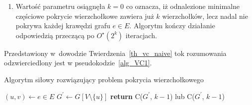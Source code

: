 {\begin{bproof}
\begin{enumerate}
      \item Wartość parametru osiągnęła $k=0$ co oznacza, iż odnalezione minimalne częściowe pokrycie wierzchołkowe zawiera już $k$ wierzchołków, lecz nadal nie pokrywa każdej krawędzi grafu $e \in E$.
      Algorytm kończy działanie odpowiedzią przeczącą po $O^\star(2^k)$ iteracjach.
    \end{enumerate}
  \end{bproof}
  Przedstawiony w~dowodzie Twierdzenia~\ref{th_vc_naive} tok rozumowania odzwierciedlony jest w pseudokodzie~\ref{alg_VC1}.
  \begin{algorithm}
    \caption{Algorytm siłowy rozwiązujący problem pokrycia wierzchołkowego}\label{alg_VC1}
    \begin{algorithmic}[1]



        \EndIf
        \EndIf
        \State $(u,v) \leftarrow e \in E$
        \State $G^\prime \gets G[V\setminus \{u\}]$
        \State \textbf{return} {C($G^\prime$, $k-1$) lub C($G^\prime$, $k-1$)}
      \EndFunction
    \end{algorithmic}
  \end{algorithm}
}

